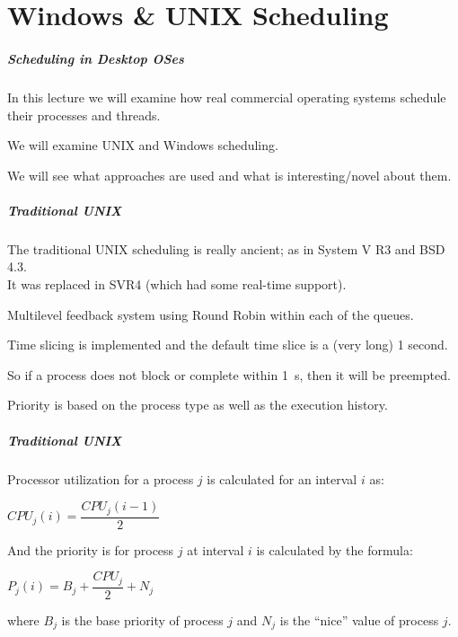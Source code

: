 \part{Windows \& UNIX Scheduling}

\begin{frame}
\partpage
\end{frame}

\begin{frame}
\frametitle{Scheduling in Desktop OSes}

In this lecture we will examine how real commercial operating systems schedule their processes and threads. 

We will examine UNIX and Windows scheduling. 

We will see what approaches are used and what is interesting/novel about them.


\end{frame}

\begin{frame}
\frametitle{Traditional UNIX}

The traditional UNIX scheduling is really ancient; as in System V R3 and BSD 4.3.\\
\quad It was replaced in SVR4 (which had some real-time support).

Multilevel feedback system using Round Robin within each of the queues. 

Time slicing is implemented and the default time slice is a (very long) 1 second. 

So if a process does not block or complete within 1~s, then it will be preempted. 

Priority is based on the process type as well as the execution history.

\end{frame}

\begin{frame}
\frametitle{Traditional UNIX}

Processor utilization for a process $j$ is calculated for an interval $i$ as:

\begin{center}
$CPU_{j}(i) = \dfrac{CPU_{j}(i - 1)}{2}$
\end{center}

And the priority is for process $j$ at interval $i$ is calculated by the formula:

\begin{center}
$P_{j}(i) = B_{j} + \dfrac{CPU_{j}}{2} + N_{j}$
\end{center}

where $B_{j}$ is the base priority of process $j$ and $N_{j}$ is the ``nice'' value of process $j$.


\end{frame}

